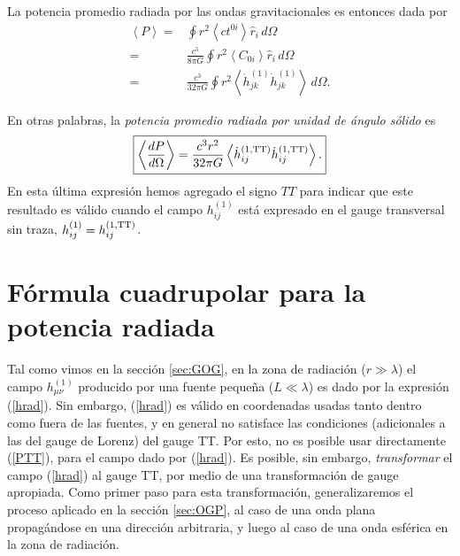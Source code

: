 La potencia promedio radiada por las ondas gravitacionales es entonces dada por
\begin{align}
\left\langle P\right\rangle =& \oint r^2 \left\langle ct^{0i}\right\rangle\hat{r}_i\,d\Omega\\
=& \frac{c^5}{8\pi G}\oint r^2\left\langle C_{0i}\right\rangle\hat{r}_i\,d\Omega\\
=& \frac{c^3}{32\pi G} \oint r^2\left\langle\dot{h}_{jk}^{(1)}\dot{h}_{jk}^{(1)}\right\rangle\,d\Omega .
\end{align}

En otras palabras, la \textit{potencia promedio radiada por unidad de ángulo sólido} es
\begin{equation}\label{PTT}
\boxed{\left\langle\frac{d P}{d\Omega}\right\rangle=\frac{c^3r^2}{32\pi G} \left\langle\dot{h}_{ij}^{(1,\rm TT)}\dot{h}_{ij}^{(1,\rm TT)}\right\rangle .}
\end{equation}
En esta última expresión hemos agregado el signo $TT$ para indicar que este resultado es válido cuando el campo $h^{(1)}_{ij}$ está expresado en el gauge transversal sin traza, $h^{(1)}_{ij}=h^{(1,\rm TT)}_{ij}$.

\section{Fórmula cuadrupolar para la potencia radiada}
Tal como vimos en la sección \ref{sec:GOG}, en la zona de radiación ($r\gg\lambda$) el campo $h^{(1)}_{\mu\nu}$ producido por una fuente pequeña ($L\ll\lambda$) es dado por la expresión (\ref{hrad}). Sin embargo, (\ref{hrad}) es válido en coordenadas usadas tanto dentro como fuera de las fuentes, y en general no satisface las condiciones (adicionales a las del gauge de Lorenz) del gauge TT. Por esto, no es posible usar directamente (\ref{PTT}), para el campo dado por (\ref{hrad}). Es posible, sin embargo, \textit{transformar} el campo (\ref{hrad}) al gauge TT, por medio de una transformación de gauge apropiada. Como primer paso para esta transformación, generalizaremos el proceso aplicado en la sección \ref{sec:OGP}, al caso de una onda plana propagándose en una dirección arbitraria, y luego al caso de una onda esférica en la zona de radiación.

